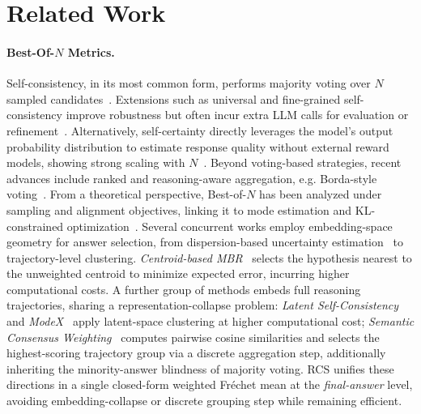 \section{Related Work}

\paragraph{Best-Of-$N$ Metrics.}
Self-consistency, in its most common form, performs majority voting over $N$ sampled candidates~\citep{wang2022self}. 
Extensions such as universal and fine-grained self-consistency improve robustness but often incur extra LLM calls for evaluation or refinement~\citep{chen2023universal,wang2024integrate}. 
Alternatively, self-certainty directly leverages the model's output probability distribution to estimate response quality without external reward models, showing strong scaling with $N$~\citep{kang2025scalable}.
Beyond voting-based strategies, recent advances include ranked and reasoning-aware aggregation, e.g. Borda-style voting~\citep{wang2025ranked, wan2025reasoning}. 
From a theoretical perspective, Best-of-$N$ has been analyzed under sampling and alignment objectives, linking it to mode estimation and KL-constrained optimization~\citep{gui2024bonbon, cordero2025certified}.
Several concurrent works employ embedding-space geometry for answer selection, from dispersion-based uncertainty estimation~\citep{nguyen2025distance} to trajectory-level clustering.
\textit{Centroid-based MBR}~\citep{deguchi2024centroid} selects the hypothesis nearest to the unweighted centroid to minimize expected error, incurring higher computational costs.
A further group of methods embeds full reasoning trajectories, sharing a representation-collapse problem: \textit{Latent Self-Consistency}~\citep{chen2024latent} and \textit{ModeX}~\citep{choi2026modex} apply latent-space clustering at higher computational cost; 
\textit{Semantic Consensus Weighting}~\citep{jain2023sc} computes pairwise cosine similarities and selects the highest-scoring trajectory group via a discrete aggregation step, additionally inheriting the minority-answer blindness of majority voting.
RCS unifies these directions in a single closed-form weighted Fr\'echet mean at the \emph{final-answer} level, avoiding embedding-collapse or discrete grouping step while remaining efficient.

